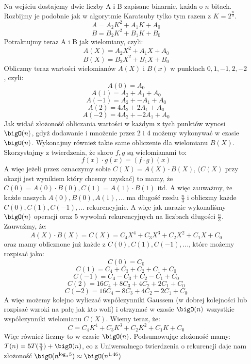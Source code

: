 Na wejściu dostajemy dwie liczby A i B zapisane binarnie, każda o $n$ bitach. Rozbijmy je podobnie jak w algorytmie Karatsuby tylko tym razem z $K = 2^{\frac{n}{3}}$.
$$A = A_2 K^2 + A_1 K + A_0$$
$$B = B_2 K^2 + B_1 K + B_0$$
Potraktujmy teraz A i B jak wielomiany, czyli:
$$A(X) = A_2 X^2 + A_1 X + A_0$$
$$B(X) = B_2 X^2 + B_1 X + B_0$$
Obliczmy teraz wartości wielomianów $A(X)$ i $B(x)$ w punktach $0,1,-1,2,-2$, czyli:
$$A(0) = A_0$$
$$A(1) = A_2 + A_1 + A_0$$
$$A(-1) = A_2 + -A_1 + A_0$$
$$A(2) = 4A_2 + 2A_1 + A_0$$
$$A(-2) = 4A_2 + -2A_1 + A_0$$
Jak widać złożoność obliczania wartości w każdym z tych punktów wynosi $\bigO(n)$, gdyż dodawanie i mnożenie przez 2 i 4 możemy wykonywać w czasie $\bigO(n)$. Wykonajmy również takie same obliczenie dla wielomianu $B(X)$. Skorzystajmy z twierdzenia, że skoro $f,g$ są wielomianami to:
$$f(x) \cdot g(x) = (f\cdot g)(x)$$
A więc jeżeli przez oznaczymy sobie $C(X) = A(X)\cdot B(X)$, ($C(X)$ przy okazji jest wynikiem który chcemy uzyskać) to mamy, że $C(0) = A(0)\cdot B(0), C(1) = A(1)\cdot B(1)$ itd. A więc zauważmy, że każde naszych $A(0),B(0),A(1),...$ ma długość rzedu $\frac{n}{3}$ i obliczmy każde $C(0),C(1),C(-1),...$ rekurencyjnie. A więc jak narazie wykonaliśmy $\bigO(n)$ operacji oraz 5 wywołań rekurencyjnych na liczbach długości $\frac{n}{3}$. Zauważmy, że:
$$A(X)\cdot B(X) = C(X) = C_4X^4 + C_3X^3 + C_2X^2 + C_1X + C_0$$
oraz mamy oblicznone już każde z $C(0),C(1),C(-1),...$, które możemy rozpisać jako:
$$C(0) = C_0$$
$$C(1) = C_4 + C_3 + C_2 + C_1 + C_0$$
$$C(-1) = C_4 - C_3 + C_2 - C_1 + C_0$$
$$C(2) = 16C_4 + 8C_3 + 4C_2 + 2C_1 + C_0$$
$$C(-2) = 16C_4 - 8C_3 + 4C_2 - 2C_1 + C_0$$
A więc możemy kolejno wyliczać współczynniki Gaussem (w dobrej kolejności lub rozpisać wzroki na pałę jak kto woli) i otrzymać w czasie $\bigO(n)$ wszystkie współczynniki wielomianu $C(X)$. Wiemy teraz, że:
$$C = C_4K^4 + C_3K^3 + C_2K^2 + C_1K + C_0$$
Więc również liczmy to w czasie $\bigO(n)$. Podsumowując złożoność mamy: $T(n) = 5T(\frac{n}{3}) + \bigO(n)$, co z Uniwersalnego twierdzenia o rekurencji daje nam złożoność $\bigO(n^{\log_3 5}) \approx \bigO(n^{1.46})$


